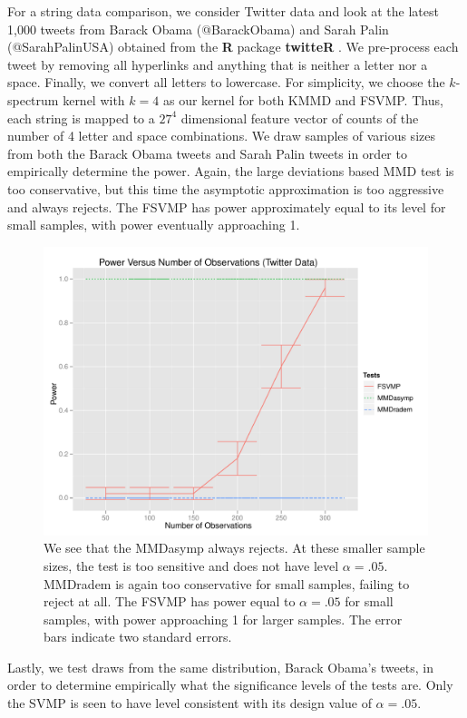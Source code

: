 \documentclass{article} %
\theoremstyle{remark}
\begin{document}
For a string data comparison, we consider Twitter data and look at the
latest 1,000 tweets from Barack Obama (@BarackObama) and Sarah Palin
(@SarahPalinUSA) obtained from the {\bf R} package {\bf twitteR} \cite{twitteR}.  We pre-process each tweet by removing all
hyperlinks and anything that is neither a letter nor a space.
Finally, we convert all letters to lowercase.  For simplicity, we
choose the $k$-spectrum kernel with $k=4$ \cite{leslie2002spectrum}
as our kernel for both KMMD and FSVMP.  Thus, each string is mapped to
a $27^4$ dimensional feature vector of counts of the number of 4
letter and space combinations.  We draw samples of various sizes from
both the Barack Obama tweets and Sarah Palin tweets in order to
empirically determine the power.  Again, the large deviations based
MMD test is too conservative, but this time the asymptotic
approximation is too aggressive and always rejects.  The FSVMP has
power approximately equal to its level for small samples, with power
eventually approaching 1.  

\begin{figure}[h!]
  \centering
  \includegraphics[width=.8\linewidth]{nips2.pdf}
  \caption{We see that the MMDasymp always rejects.  At these smaller sample
    sizes, the test is too sensitive and does not have level
    $\alpha=.05$.
    MMDradem is again too conservative for small samples, failing to
  reject at all.  The FSVMP has power equal to
  $\alpha=.05$ for small samples, with power approaching 1 for larger samples.
The error bars indicate two standard errors.}
\end{figure}

Lastly, we test draws from the same distribution, Barack Obama's
tweets, in order to determine empirically what the significance levels
of the tests are.  Only the SVMP is seen to have level consistent with
its design value of $\alpha=.05$.
\end{document}
